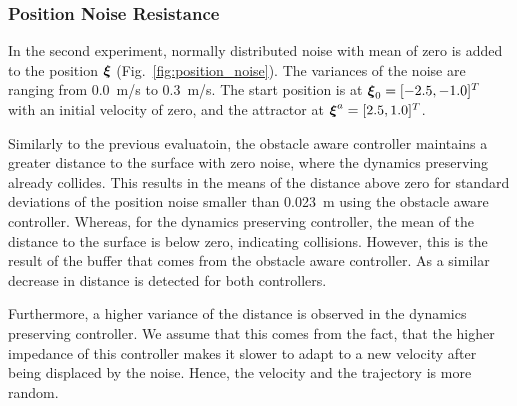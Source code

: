 \subsubsection{Position Noise Resistance} \label{sec:position_noise}
In the second experiment, normally distributed noise with mean of zero is added to the position $\boldsymbol{ \xi}$ (Fig.~\ref{fig:position_noise}). The variances of the noise are ranging from \qty{0.0}{m/s} to \qty{0.3}{m/s}. The start position is at $\boldsymbol{\xi}_0 = [-2.5, -1.0]^T$ with an initial velocity of zero, and  the attractor at $\boldsymbol{\xi}^a = [2.5, 1.0]^T$.

Similarly to the previous evaluatoin, the obstacle aware controller maintains a greater distance to the surface with zero noise, where the dynamics preserving already collides.
This results in the means of the  distance above zero for standard deviations of the position noise smaller than \qty{0.023}{m} using the obstacle aware controller. Whereas, for the dynamics preserving controller, the mean of the distance to the surface is below zero, indicating collisions.
However, this is the result of the buffer that comes from the obstacle aware controller. 
As a similar decrease in distance is detected for both controllers. 

Furthermore, a higher variance of the distance is observed in the dynamics preserving controller. We assume that this comes from the fact, that the higher impedance of this controller makes it slower to adapt to a new velocity after being displaced by the noise. Hence, the velocity and the trajectory is more random. 

